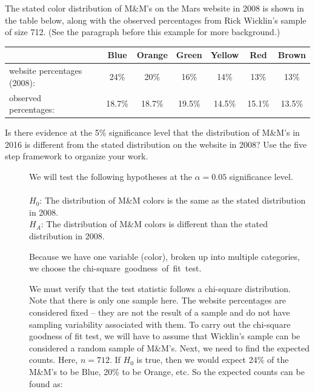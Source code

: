 \begin{examplewrap}
\begin{nexample}
{The stated color distribution of M\&M's on the Mars website in 2008 is shown in the table below, along with the observed percentages from Rick Wicklin's sample of size 712. (See the paragraph before this example for more background.) \\
\begin{center}
\begin{small}
\begin{tabular}{ll ccc ccc}
\hline
	 & \hspace{1mm} & Blue & Orange & Green & Yellow & Red & Brown\\
\hline
website percentages (2008):&		& 24\% & 20\% & 16\% & 14\% & 13\% & 13\%  \\
observed percentages:&		& 18.7\% & 18.7\% & 19.5\% & 14.5\% & 15.1\% & 13.5\%  \\
\hline
\end{tabular}
\end{small}
\end{center}


Is there evidence at the 5\% significance level that the distribution of M\&M's in 2016 is different from the stated distribution on the website in 2008? Use the five step framework to organize your work. }

\begin{description}
\item[]  
We will test the following hypotheses at the $\alpha=0.05$ significance level.\\
\\
$H_0$:  The distribution of M\&M colors is the same as the stated distribution in 2008. \\
$H_A$: The distribution of M\&M colors is different than the stated distribution in 2008.
 

\item[] Because we have one variable (color), broken up into multiple categories, we choose the \mbox{chi-square goodness of fit test.}
\item[]  We must verify that the test statistic follows a chi-square distribution.  Note that there is only one sample here.  The website percentages are considered fixed -- they are not the result of a sample and do not have sampling variability associated with them.  To carry out the chi-square goodness of fit test, we will have to assume that Wicklin's sample can be considered a random sample of M\&M's.  Next, we need to find the expected counts.  Here, $n=712$.  If $H_0$ is true, then we would expect 24\% of the M\&M's to be Blue, 20\% to be Orange, etc.  So the expected counts can be found as:


\end{description}
\end{nexample}
\end{examplewrap}
